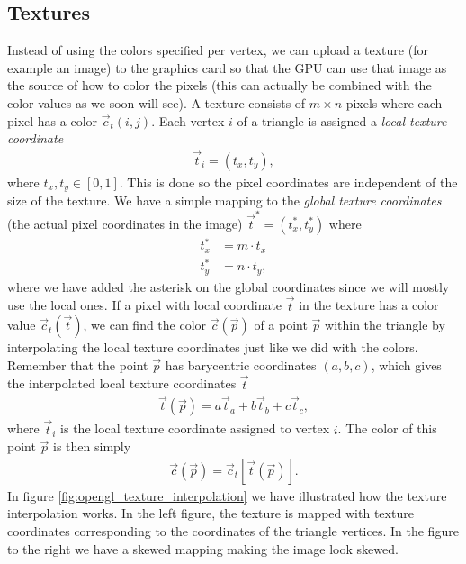 \subsection{Textures}
\label{sec:opengl_texture_interpolation}
Instead of using the colors specified per vertex, we can upload a texture (for example an image) to the graphics card so that the GPU can use that image as the source of how to color the pixels (this can actually be combined with the color values as we soon will see). A texture consists of $m\times n$ pixels where each pixel has a color $\vec c_t(i,j)$. Each vertex $i$ of a triangle is assigned a \textit{local texture coordinate} 
\begin{align}
	\vec t_i = (t_x, t_y),
\end{align}
where $t_x, t_y \in [0,1]$. This is done so the pixel coordinates are independent of the size of the texture. We have a simple mapping to the \textit{global texture coordinates} (the actual pixel coordinates in the image) $\vec t^* = (t_x^*, t_y^*)$ where 
\begin{align}
	\nonumber
	t_x^* &= m\cdot t_x\\
	t_y^* &= n\cdot t_y,
\end{align}
where we have added the asterisk on the global coordinates since we will mostly use the local ones. If a pixel with local coordinate $\vec t$ in the texture has a color value $\vec c_t(\vec t)$, we can find the color $\vec c(\vec p)$ of a point $\vec p$ within the triangle by interpolating the local texture coordinates just like we did with the colors. Remember that the point $\vec p$ has barycentric coordinates $(a,b,c)$, which gives the interpolated local texture coordinates $\vec t$
\begin{align}
	\vec t(\vec p) =  a\vec t_a + b\vec t_b + c\vec t_c,
\end{align}
where $\vec t_i$ is the local texture coordinate assigned to vertex $i$. The color of this point $\vec p$ is then simply
\begin{align}
	\vec c(\vec p) = \vec c_t[\vec t(\vec p)].
\end{align}
In figure \ref{fig:opengl_texture_interpolation} we have illustrated how the texture interpolation works. In the left figure, the texture is mapped with  texture coordinates corresponding to the coordinates of the triangle vertices. In the figure to the right we have a skewed mapping making the image look skewed.
